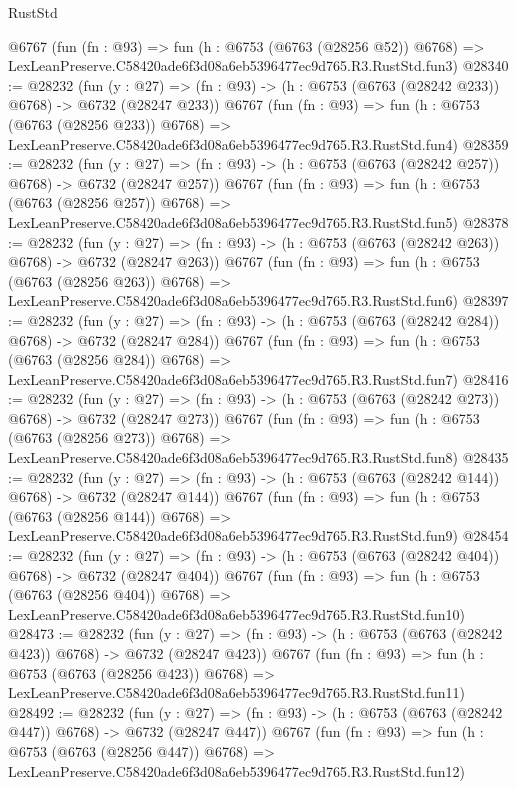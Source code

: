 \begin{lexlean}{RustStd}
\begin{coremodule}
    @6767
    (fun (fn : @93) =>
    fun (h : @6753 (@6763 (@28256 @52)) @6768) =>
    LexLeanPreserve.C58420ade6f3d08a6eb5396477ec9d765.R3.RustStd.fun3)
@28340 := @28232
    (fun (y : @27) => (fn : @93) -> (h : @6753 (@6763 (@28242 @233)) @6768) -> @6732 (@28247 @233))
    @6767
    (fun (fn : @93) =>
    fun (h : @6753 (@6763 (@28256 @233)) @6768) =>
    LexLeanPreserve.C58420ade6f3d08a6eb5396477ec9d765.R3.RustStd.fun4)
@28359 := @28232
    (fun (y : @27) => (fn : @93) -> (h : @6753 (@6763 (@28242 @257)) @6768) -> @6732 (@28247 @257))
    @6767
    (fun (fn : @93) =>
    fun (h : @6753 (@6763 (@28256 @257)) @6768) =>
    LexLeanPreserve.C58420ade6f3d08a6eb5396477ec9d765.R3.RustStd.fun5)
@28378 := @28232
    (fun (y : @27) => (fn : @93) -> (h : @6753 (@6763 (@28242 @263)) @6768) -> @6732 (@28247 @263))
    @6767
    (fun (fn : @93) =>
    fun (h : @6753 (@6763 (@28256 @263)) @6768) =>
    LexLeanPreserve.C58420ade6f3d08a6eb5396477ec9d765.R3.RustStd.fun6)
@28397 := @28232
    (fun (y : @27) => (fn : @93) -> (h : @6753 (@6763 (@28242 @284)) @6768) -> @6732 (@28247 @284))
    @6767
    (fun (fn : @93) =>
    fun (h : @6753 (@6763 (@28256 @284)) @6768) =>
    LexLeanPreserve.C58420ade6f3d08a6eb5396477ec9d765.R3.RustStd.fun7)
@28416 := @28232
    (fun (y : @27) => (fn : @93) -> (h : @6753 (@6763 (@28242 @273)) @6768) -> @6732 (@28247 @273))
    @6767
    (fun (fn : @93) =>
    fun (h : @6753 (@6763 (@28256 @273)) @6768) =>
    LexLeanPreserve.C58420ade6f3d08a6eb5396477ec9d765.R3.RustStd.fun8)
@28435 := @28232
    (fun (y : @27) => (fn : @93) -> (h : @6753 (@6763 (@28242 @144)) @6768) -> @6732 (@28247 @144))
    @6767
    (fun (fn : @93) =>
    fun (h : @6753 (@6763 (@28256 @144)) @6768) =>
    LexLeanPreserve.C58420ade6f3d08a6eb5396477ec9d765.R3.RustStd.fun9)
@28454 := @28232
    (fun (y : @27) => (fn : @93) -> (h : @6753 (@6763 (@28242 @404)) @6768) -> @6732 (@28247 @404))
    @6767
    (fun (fn : @93) =>
    fun (h : @6753 (@6763 (@28256 @404)) @6768) =>
    LexLeanPreserve.C58420ade6f3d08a6eb5396477ec9d765.R3.RustStd.fun10)
@28473 := @28232
    (fun (y : @27) => (fn : @93) -> (h : @6753 (@6763 (@28242 @423)) @6768) -> @6732 (@28247 @423))
    @6767
    (fun (fn : @93) =>
    fun (h : @6753 (@6763 (@28256 @423)) @6768) =>
    LexLeanPreserve.C58420ade6f3d08a6eb5396477ec9d765.R3.RustStd.fun11)
@28492 := @28232
    (fun (y : @27) => (fn : @93) -> (h : @6753 (@6763 (@28242 @447)) @6768) -> @6732 (@28247 @447))
    @6767
    (fun (fn : @93) =>
    fun (h : @6753 (@6763 (@28256 @447)) @6768) =>
    LexLeanPreserve.C58420ade6f3d08a6eb5396477ec9d765.R3.RustStd.fun12)

\end{coremodule}
\end{lexlean}
